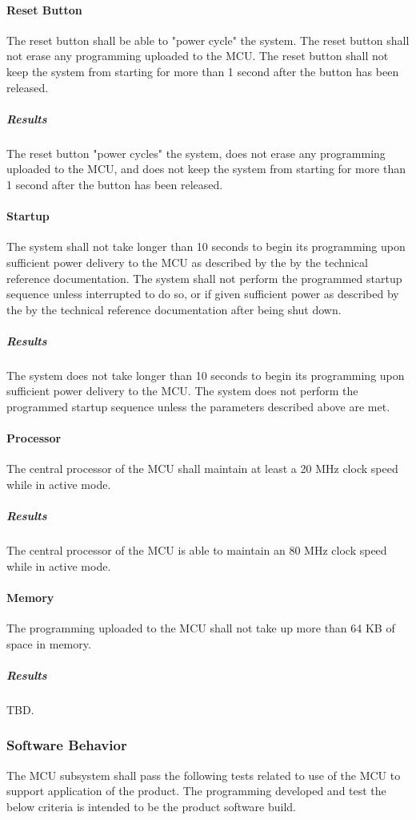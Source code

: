 \paragraph{Reset Button} The reset button shall be able to "power cycle" the system. The reset button shall not erase
any programming uploaded to the MCU. The reset button shall not keep the
system from starting for more than 1 second after the button has been released.
\subparagraph{Results} The reset button "power cycles" the system, does not erase any programming uploaded to the MCU, and does not keep the system from starting for more than 1 second after the button has been released.

\paragraph{Startup} The system shall not take longer than 10 seconds to begin
its programming upon sufficient power delivery to the MCU as described by
the by the technical reference documentation. The system shall not perform
the programmed startup sequence unless interrupted to do so, or if given
sufficient power as described by the by the technical reference documentation
after being shut down.
\subparagraph{Results} The system does not take longer than 10 seconds to begin
its programming upon sufficient power delivery to the MCU. The system does not perform
the programmed startup sequence unless the parameters described above are met.

\paragraph{Processor} The central processor of the MCU shall maintain at
least a 20 MHz clock speed while in active mode.
\subparagraph{Results} The central processor of the MCU is able to maintain an 80 MHz clock speed while in active mode.

\paragraph{Memory} The programming uploaded to the MCU shall not take up
more than 64 KB of space in memory.
\subparagraph{Results} TBD.

\subsubsection{Software Behavior} The MCU subsystem shall pass the following
tests related to use of the MCU to support application of the product. The
programming developed and test the below criteria is intended to be the
product software build.

